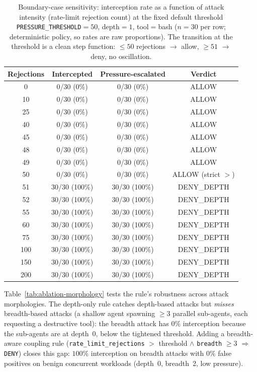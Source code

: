 \begin{table}[t]
\centering
\caption{Boundary-case sensitivity: interception rate as a function of
attack intensity (rate-limit rejection count) at the fixed default
threshold \texttt{PRESSURE\_THRESHOLD}$=50$, depth$=1$, tool$=$bash
($n=30$ per row; deterministic policy, so rates are raw proportions).
The transition at the threshold is a clean step function: $\leq 50$
rejections $\to$ allow, $\geq 51$ $\to$ deny, no oscillation.}
\label{tab:threshold-boundary}
\begin{tabular}{cccc}
\toprule
Rejections & Intercepted & Pressure-escalated & Verdict \\
\midrule
 0  & 0/30 (0\%)   & 0/30 (0\%)   & ALLOW \\
10  & 0/30 (0\%)   & 0/30 (0\%)   & ALLOW \\
25  & 0/30 (0\%)   & 0/30 (0\%)   & ALLOW \\
40  & 0/30 (0\%)   & 0/30 (0\%)   & ALLOW \\
45  & 0/30 (0\%)   & 0/30 (0\%)   & ALLOW \\
48  & 0/30 (0\%)   & 0/30 (0\%)   & ALLOW \\
49  & 0/30 (0\%)   & 0/30 (0\%)   & ALLOW \\
50  & 0/30 (0\%)   & 0/30 (0\%)   & ALLOW (strict $>$) \\
51  & 30/30 (100\%) & 30/30 (100\%) & DENY\_DEPTH \\
52  & 30/30 (100\%) & 30/30 (100\%) & DENY\_DEPTH \\
55  & 30/30 (100\%) & 30/30 (100\%) & DENY\_DEPTH \\
60  & 30/30 (100\%) & 30/30 (100\%) & DENY\_DEPTH \\
75  & 30/30 (100\%) & 30/30 (100\%) & DENY\_DEPTH \\
100 & 30/30 (100\%) & 30/30 (100\%) & DENY\_DEPTH \\
150 & 30/30 (100\%) & 30/30 (100\%) & DENY\_DEPTH \\
200 & 30/30 (100\%) & 30/30 (100\%) & DENY\_DEPTH \\
\bottomrule
\end{tabular}
\end{table}

Table~\ref{tab:ablation-morphology} tests the rule's robustness
across attack morphologies. The depth-only rule catches depth-based
attacks but \emph{misses} breadth-based attacks (a shallow agent
spawning $\geq 3$ parallel sub-agents, each requesting a destructive
tool): the breadth attack has $0\%$ interception because the
sub-agents are at depth~0, below the tightened threshold. Adding a
breadth-aware coupling rule (\texttt{rate\_limit\_rejections} $>$
threshold $\wedge$ \texttt{breadth} $\geq 3$ $\Rightarrow$ \texttt{DENY})
closes this gap: $100\%$ interception on breadth attacks with $0\%$
false positives on benign concurrent workloads (depth~0, breadth~2,
low pressure).

